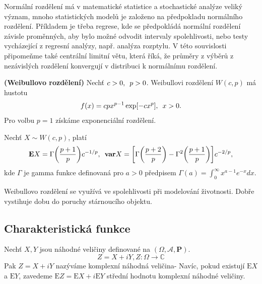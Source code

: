 \begin{remark}
Normální rozdělení má v matematické statistice a stochastické analýze veliký význam, mnoho statistických modelů je založeno na předpokladu normálního rozdělení. Příkladem je třeba regrese, kde se předpokládá normální rozdělení závisle proměnných, aby bylo možné odvodit intervaly spolehlivosti, nebo testy vycházející z regresní analýzy, např. analýza rozptylu. V této souvislosti připomeňme také centrální limitní větu, která říká, že průměry z výběrů z nezávislých rozdělení konvergují v distribuci k normálnímu rozdělení.
\end{remark}

\begin{definition}{\textbf{(Weibullovo rozdělení)}}
Nechť $c > 0, \enskip p > 0$. Weibullovi rozdělení $W(c, p)$ má hustotu
\begin{equation}
f(x) = cpx^{p-1}\exp[-cx^{p}], \enskip x > 0.
\end{equation}
Pro volbu $p = 1$ získáme exponenciální rozdělení.
\end{definition}

\begin{proposition}
Nechť $X \sim W(c, p)$, platí
\begin{equation}
\mathbf{E}X = \Gamma\bigg( \frac{p + 1}{p} \bigg) c^{-1/p}, \enskip \mathbf{var}X = \bigg[ \Gamma \bigg( \frac{p+2}{p}\bigg) - \Gamma^{2} \bigg( \frac{p + 1}{p}\bigg) \bigg] c^{-2/p}, 
\end{equation}
kde $\Gamma$ je gamma funkce definovaná pro $a>0$ předpisem $\Gamma(a) = \int_{0}^{\infty} x^{a - 1}e^{-x}dx.$
\end{proposition}

\begin{remark}
Weibullovo rozdělení se využívá ve spolehlivosti při modelování životnosti. Dobře vystihuje dobu do poruchy stárnoucího objektu.
\end{remark}







\subsection{Charakteristická funkce}
\begin{definition}
Nechť $X,Y$ jsou náhodné veličiny definované na $(\Omega,\mathcal{A},\textbf{P})$.\begin{equation}
Z=X+iY, Z:\Omega\rightarrow\mathbb{C}
\end{equation}
Pak $Z=X+iY$ nazýváme komplexní náhodná veličina- Navíc, pokud existují $\mathrm{E}X$ a $\mathrm{E}Y$, zavedeme $\mathrm{E}Z=\mathrm{E}X+i\mathrm{E}Y$ střední hodnotu komplexní náhodné veličiny.
\end{definition}


